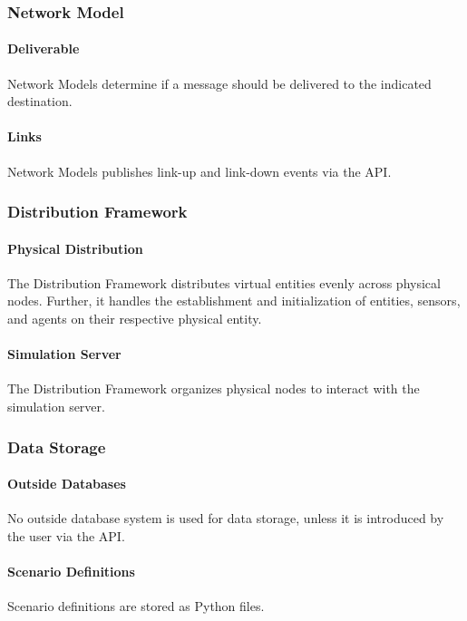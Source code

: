 \documentclass[titlepage]{article}
\begin{document}
\subsubsection{Network Model}
    \paragraph{Deliverable} Network Models determine if a message should be delivered to the indicated destination.
    \paragraph{Links} Network Models publishes link-up and link-down events via the API.

\subsubsection{Distribution Framework}
	\paragraph{Physical Distribution} The Distribution Framework distributes virtual entities evenly across physical nodes. Further, it handles the establishment and initialization of entities, sensors, and agents on their respective physical entity.
	\paragraph{Simulation Server} The Distribution Framework organizes physical nodes to interact with the simulation server.


\subsubsection{Data Storage%
  \label{data-storage}%
}
    \paragraph{Outside Databases} No outside database system is used for data storage, unless it is introduced by the user via the API.
    \paragraph{Scenario Definitions} Scenario definitions are stored as Python files.
\end{document}
